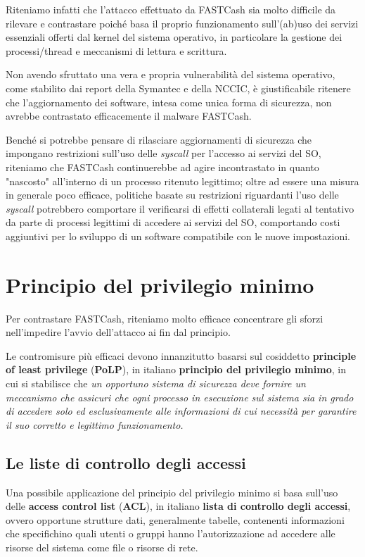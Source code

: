 \documentclass[10pt,a4paper, titlepage]{report}
\begin{document}
Riteniamo infatti che l'attacco effettuato da FASTCash sia molto difficile da rilevare e contrastare poiché basa il proprio funzionamento sull'(ab)uso dei servizi essenziali offerti dal kernel del sistema operativo, in particolare la gestione dei processi/thread e meccanismi di lettura e scrittura. 

Non avendo sfruttato una vera e propria vulnerabilità del sistema operativo, come stabilito dai report della Symantec e della NCCIC, è giustificabile ritenere che l'aggiornamento dei software, intesa come unica forma di sicurezza, non avrebbe contrastato efficacemente il malware FASTCash. 

Benché si potrebbe pensare di rilasciare aggiornamenti di sicurezza che impongano restrizioni sull'uso delle \textit{syscall} per l'accesso ai servizi del SO, riteniamo che FASTCash continuerebbe ad agire incontrastato in quanto "nascosto" all'interno di un processo ritenuto legittimo; oltre ad essere una misura in generale poco efficace, politiche basate su restrizioni riguardanti l'uso delle \textit{syscall} potrebbero comportare il verificarsi di effetti collaterali legati al tentativo da parte di processi legittimi di accedere ai servizi del SO, comportando costi aggiuntivi per lo sviluppo di un software compatibile con le nuove impostazioni. 

\section{Principio del privilegio minimo}

Per contrastare FASTCash, riteniamo molto efficace concentrare gli sforzi nell'impedire l'avvio dell'attacco ai fin dal principio. 

Le contromisure più efficaci devono innanzitutto basarsi sul cosiddetto \textbf{principle of least privilege} (\textbf{PoLP}), in italiano \textbf{principio del privilegio minimo}, in cui si stabilisce che \textit{un opportuno sistema di sicurezza deve fornire un meccanismo che assicuri che ogni processo in esecuzione sul sistema sia in grado di accedere solo ed esclusivamente alle informazioni di cui necessità per garantire il suo corretto e legittimo funzionamento.}

\subsection{Le liste di controllo degli accessi}

Una possibile applicazione del principio del privilegio minimo si basa sull'uso delle \textbf{access control list} (\textbf{ACL}), in italiano \textbf{lista di controllo degli accessi}, ovvero opportune strutture dati, generalmente tabelle, contenenti informazioni che specifichino quali utenti o gruppi hanno l'autorizzazione ad accedere alle risorse del sistema come file o risorse di rete.
\end{document}
